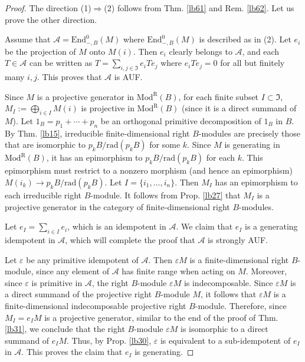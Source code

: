 \documentclass[11pt,b5paper,notitlepage]{article}
\theoremstyle{definition}
\theoremstyle{plain}
\newcommand{\fk}{\mathfrak}
\newcommand{\mc}{\mathcal}
\newcommand{\End}{\mathrm{End}} %
\newcommand{\ModR}{\mathrm{Mod}^{\mathrm R}}
\newcommand{\eps}{\varepsilon}
\newcommand{\rad}{\mathrm{rad}}
\numberwithin{equation}{section}
\begin{document}
\begin{proof}
The direction (1)$\Rightarrow$(2) follows from Thm. \ref{lb61} and Rem. \ref{lb62}. Let us prove the other direction.

Assume that $\mc A=\End^0_{-,B}(M)$ where $\End^0_{-,B}(M)$ is described as in (2). Let $e_i$ be the projection of $M$ onto $M(i)$. Then $e_i$ clearly belongs to $\mc A$, and each $T\in\mc A$ can be written as $T=\sum_{i,j\in\fk I}e_i Te_j$ where $e_iTe_j=0$ for all but finitely many $i,j$. This proves that $\mc A$ is AUF.

Since $M$ is a projective generator in $\ModR(B)$, for each finite subset $I\subset\fk I$, $M_I:=\bigoplus_{i\in I}M(i)$ is projective in $\ModR(B)$ (since it is a direct summand of $M$). Let $1_B=p_1+\cdots+p_n$ be an orthogonal primitive decomposition of $1_B$ in $B$. By Thm. \ref{lb15}, irreducible finite-dimensional right $B$-modules are precisely those that are isomorphic to $p_kB/\rad(p_kB)$ for some $k$. Since $M$ is generating in $\ModR(B)$, it has an epimorphism to $p_kB/\rad(p_kB)$ for each $k$. This epimorphism must restrict to a nonzero morphism (and hence an epimorphism) $M(i_k)\rightarrow p_kB/\rad(p_kB)$. Let $I=\{i_1,\dots,i_n\}$. Then $M_I$ has an epimorphism to each irreducible right $B$-module. It follows from Prop. \ref{lb27} that $M_I$ is a projective generator in the category of finite-dimensional right $B$-modules. 

Let $e_I=\sum_{i\in I}e_i$, which is an idempotent in $\mc A$. We claim that $e_I$ is a generating idempotent in $\mc A$, which will complete the proof that $\mc A$ is strongly AUF.

Let $\eps$ be any primitive idempotent of $\mc A$. Then $\eps M$ is a finite-dimensional right $B$-module, since any element of $\mc A$ has finite range when acting on $M$. Moreover, since $\eps$ is primitive in $\mc A$, the right $B$-module $\eps M$ is indecomposable. Since $\eps M$ is a direct summand of the projective right $B$-module $M$, it follows that $\eps M$ is a finite-dimensional indecomposable projective right $B$-module. Therefore, since $M_I=e_IM$ is a projective generator, similar to the end of the proof of Thm. \ref{lb31}, we conclude that the right $B$-module $\eps M$ is isomorphic to a direct summand of $e_IM$. Thus, by Prop. \ref{lb30}, $\eps$ is equivalent to a sub-idempotent of $e_I$ in $\mc A$. This proves the claim that $e_I$ is generating.
\end{proof}
\end{document}
